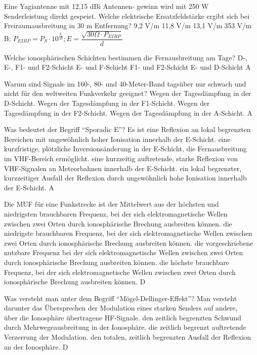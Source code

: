 {Eine Yagiantenne mit 12,15 dBi Antennen- gewinn wird mit 250 W Senderleistung direkt gespeist. Welche elektrische Ersatzfeldstärke ergibt sich bei Freiraumausbreitung in 30 m Entfernung?}%
{9,2 V/m}%
{11,8 V/m}%
{13,1 V/m}%
{353 V/m}%
{B; $P_{EIRP} = P_S \cdot 10^{\frac{g_i}{10}}; E=\dfrac{\sqrt{30\Omega \cdot P_{EIRP}}}{d}$}%

{Welche ionosphärischen Schichten bestimmen die Fernausbreitung am Tage?}%
{D-, E-, F1- und F2-Schicht}%
{E- und F-Schicht}%
{F1- und F2-Schicht}%
{E- und D-Schicht}%
{A}%

{ Warum sind Signale im 160-, 80- und 40-Meter-Band tagsüber nur schwach und nicht für den weltweiten Funkverkehr geeignet?}%
{Wegen der Tagesdämpfung in der D-Schicht.}%
{Wegen der Tagesdämpfung in der F1-Schicht.}%
{Wegen der Tagesdämpfung in der F2-Schicht.}%
{Wegen der Tagesdämpfung in der A-Schicht.}%
{A}%

{Was bedeutet der Begriff ``Sporadic E''? Es ist}%
{eine Reflexion an lokal begrenzten Bereichen mit ungewöhnlich hoher Ionisation innerhalb der E-Schicht.}%
{eine kurzfristige, plötzliche Inversionsänderung in der E-Schicht, die Fernausbreitung im VHF-Bereich ermöglicht.}%
{eine kurzzeitig auftretende, starke Reflexion von VHF-Signalen an Meteorbahnen innerhalb der E-Schicht.}%
{ein lokal begrenzter, kurzzeitiger Ausfall der Reflexion durch ungewöhnlich hohe Ionisation innerhalb der E-Schicht.}%
{A}%

{Die MUF für eine Funkstrecke ist}%
{der Mittelwert aus der höchsten und niedrigsten brauchbaren Frequenz, bei der sich elektro­magnetische Wellen zwischen zwei Orten durch ionosphärische Brechung ausbreiten können.}%
{die niedrigste brauchbaren Frequenz, bei der sich elektromagnetische Wellen zwischen zwei Orten durch ionosphärische Brechung ausbreiten können.}%
{die vorgeschriebene nutzbare Frequenz bei der sich elektromagnetische Wellen zwischen zwei Orten durch ionosphärische Brechung ausbreiten können.}%
{die höchste brauchbare Frequenz, bei der sich elektromagnetische Wellen zwischen zwei Orten durch ionosphärische Brechung ausbreiten können.}%
{D}%

{Was versteht man unter dem Begriff ``Mögel-Dellinger-Effekt''? Man versteht darunter}%
{das Übersprechen der Modulation eines starken Senders auf andere, über die Ionosphäre übertragene HF-Signale.}%
{den zeitlich begrenzten Schwund durch Mehrwegeausbreitung in der Ionosphäre.}%
{die zeitlich begrenzt auftretende Verzerrung der Modulation.}%
{den totalen, zeitlich begrenzten Ausfall der Reflexion an der Ionosphäre.}%
{D}%
